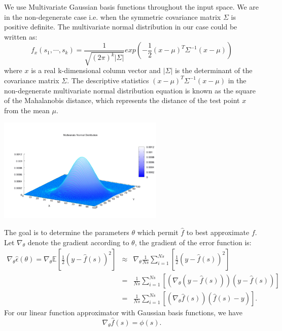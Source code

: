 \documentclass[pdftex,a4paper,12pt]{report}
\begin{document}
We use Multivariate Gaussian basis functions throughout the input space. We are in the non-degenerate case i.e. when the symmetric covariance matrix $\Sigma$ is positive definite. The multivariate normal distribution in our case could be written as:
\begin{equation}
	f_x(s_1, \cdots, s_k) = \frac{1}{\sqrt{(2\pi)^k|\Sigma|}}exp\left(-\frac{1}{2}(x - \mu)^T\Sigma^{-1}(x - \mu)\right)
\end{equation}
where $x$ is a real k-dimensional column vector and $|\Sigma|$ is the determinant of the covariance matrix $\Sigma$.
The descriptive statistics $(x - \mu)^T\Sigma^{-1}(x - \mu)$ in the non-degenerate multivariate normal distribution equation is known as the square of the Mahalanobis distance, which represents the distance of the test point $x$ from the mean $\mu$.
\begin{center}
	\includegraphics[scale=1]{images/Multivariate_Gaussian.png}
\end{center}
The goal is to determine the parameters $\mathbb{\theta}$ which permit $\hat{f}$ to best approximate $f$.
Let $\nabla_\theta$ denote the gradient according to $\theta$, the gradient of the error function is:
\begin{eqnarray}
\nabla_\theta\hat{\epsilon}(\theta) = \nabla_\theta\mathbb{E}\left[\frac{1}{2}(y - \hat{f}(s))^2\right] & \approx & \nabla_\theta\frac{1}{Ns}\sum\limits_{i=1}^{Ns}\left[\frac{1}{2}(y - \hat{f}(s))^2\right] \nonumber \\
 & = & \frac{1}{Ns}\sum\limits_{i=1}^{Ns}\left[(\nabla_\theta(y - \hat{f}(s)))(y - \hat{f}(s))\right] \nonumber \\
 & = & \frac{1}{Ns}\sum\limits_{i=1}^{Ns}\left[(\nabla_\theta\hat{f}(s))(\hat{f}(s) - y)\right].
\end{eqnarray}
For our linear function approximator with Gaussian basis functions, we have
\begin{equation}
\nabla_\theta\hat{f}(s) = \phi(s).
\end{equation}
\end{document}
